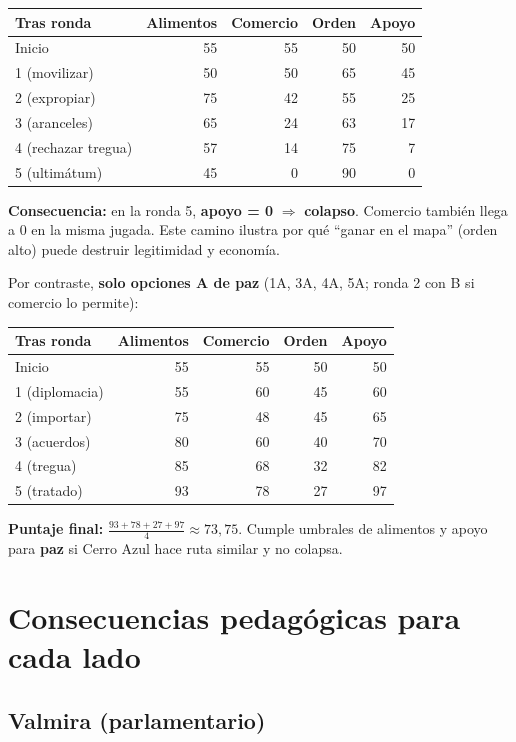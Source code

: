 \documentclass[11pt,a4paper]{article}
\begin{document}
\begin{center}
\small
\begin{tabular}{lrrrr}
\toprule
Tras ronda & Alimentos & Comercio & Orden & Apoyo \\
\midrule
Inicio & 55 & 55 & 50 & 50 \\
1 (movilizar) & 50 & 50 & 65 & 45 \\
2 (expropiar) & 75 & 42 & 55 & 25 \\
3 (aranceles) & 65 & 24 & 63 & 17 \\
4 (rechazar tregua) & 57 & 14 & 75 & 7 \\
5 (ultimátum) & 45 & 0 & 90 & 0 \\
\bottomrule
\end{tabular}
\end{center}

\textbf{Consecuencia:} en la ronda 5, \textbf{apoyo = 0} $\Rightarrow$ \textbf{colapso}. Comercio también llega a 0 en la misma jugada. Este camino ilustra por qué ``ganar en el mapa'' (orden alto) puede destruir legitimidad y economía.

Por contraste, \textbf{solo opciones A de paz} (1A, 3A, 4A, 5A; ronda 2 con B si comercio lo permite):

\begin{center}
\small
\begin{tabular}{lrrrr}
\toprule
Tras ronda & Alimentos & Comercio & Orden & Apoyo \\
\midrule
Inicio & 55 & 55 & 50 & 50 \\
1 (diplomacia) & 55 & 60 & 45 & 60 \\
2 (importar) & 75 & 48 & 45 & 65 \\
3 (acuerdos) & 80 & 60 & 40 & 70 \\
4 (tregua) & 85 & 68 & 32 & 82 \\
5 (tratado) & 93 & 78 & 27 & 97 \\
\bottomrule
\end{tabular}
\end{center}

\textbf{Puntaje final:} $\frac{93+78+27+97}{4} \approx 73{,}75$. Cumple umbrales de alimentos y apoyo para \textbf{paz} si Cerro Azul hace ruta similar y no colapsa.

\section{Consecuencias pedagógicas para cada lado}

\subsection{Valmira (parlamentario)}
\end{document}
